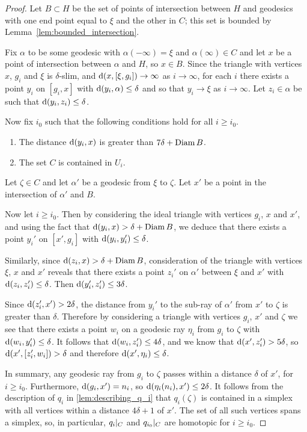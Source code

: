 \documentclass[a4paper]{article}
\begin{document}
\begin{proof}
  Let $B\subset H$ be the set of points of intersection between $H$ and
  geodesics with one end point equal to $\xi$ and the other in $C$; this set is
  bounded by Lemma~\ref{lem:bounded_intersection}.

  Fix $\alpha$ to be some geodesic with $\alpha(-\infty)=\xi$ and
  $\alpha(\infty)\in C$ and let $x$ be a point of intersection between $\alpha$
  and $H$, so $x \in B$.  Since the triangle with vertices $x$, $g_i$ and $\xi$
  is $\delta$-slim, and $\operatorname{d}(x, [\xi, g_i]) \to \infty$ as $i\to\infty$, for
  each $i$ there exists a point $y_i$ on $[g_i, x]$ with $\operatorname{d}(y_i, \alpha)
  \leq \delta$ and so that $y_i \to \xi$ as $i\to\infty$. Let $z_i \in \alpha$
  be such that $\operatorname{d}(y_i, z_i)\leq\delta$.
  
  Now fix $i_0$ such that the following conditions hold for all $i\geq 
  i_0$.
  \begin{enumerate}
    \item The distance $\operatorname{d}(y_i,x)$ is greater than $7\delta + \operatorname{Diam} B$.
    \item The set $C$ is contained in $U_i$.
  \end{enumerate}

  Let $\zeta \in C$ and let $\alpha'$ be a geodesic from $\xi$ to $\zeta$. Let 
  $x'$ be a point in the intersection of $\alpha'$ and $B$. 

  Now let $i\geq i_0$. Then by considering the ideal triangle with vertices
  $g_i$, $x$ and $x'$, and using the fact that $\operatorname{d}(y_i, x) > \delta + \operatorname{Diam}
  B$, we deduce that there exists a point $y_i'$ on $[x', g_i]$ with
  $\operatorname{d}(y_i, y_i') \leq \delta$.

  Similarly, since $\operatorname{d}(z_i, x) > \delta + \operatorname{Diam} B$, consideration of the
  triangle with vertices $\xi$, $x$ and $x'$ reveals that there exists a point
  $z_i'$ on $\alpha'$ between $\xi$ and $x'$ with $\operatorname{d}(z_i, z_i') \leq
  \delta$. Then $\operatorname{d}(y_i', z_i') \leq 3\delta$.

  Since $\operatorname{d}(z_i', x') > 2\delta$, the distance from $y_i'$ to the sub-ray of
  $\alpha'$ from $x'$ to $\zeta$ is greater than $\delta$. Therefore by
  considering a triangle with vertices $g_i$, $x'$ and $\zeta$ we see that
  there exists a point $w_i$ on a geodesic ray $\eta_i$ from $g_i$ to $\zeta$
  with $\operatorname{d}(w_i, y_i') \leq \delta$. It follows that $\operatorname{d}(w_i, z_i') \leq
  4\delta$, and we know that $\operatorname{d}(x', z_i') > 5\delta$, so $\operatorname{d}(x', [z_i',
  w_i]) > \delta$ and therefore $\operatorname{d}(x', \eta_i) \leq \delta$.

  In summary, any geodesic ray from $g_i$ to $\zeta$ passes within a distance 
  $\delta$ of $x'$, for $i\geq i_0$. Furthermore, $\operatorname{d}(g_i,x') = n_i$, so 
  $\operatorname{d}(\eta_i(n_i), x')\leq 2\delta$. It follows from the description of
  $q_i$ in \cref{lem:describing_q_i} that $q_i(\zeta)$ is contained in a
  simplex with all vertices within a distance $4\delta+1$ of $x'$. The set of
  all such vertices spans a simplex, so, in particular, $q_i\vert_{C}$ and
  $q_{i_0}\vert_{C}$ are homotopic for $i \geq i_0$. 
\end{proof}
\end{document}
